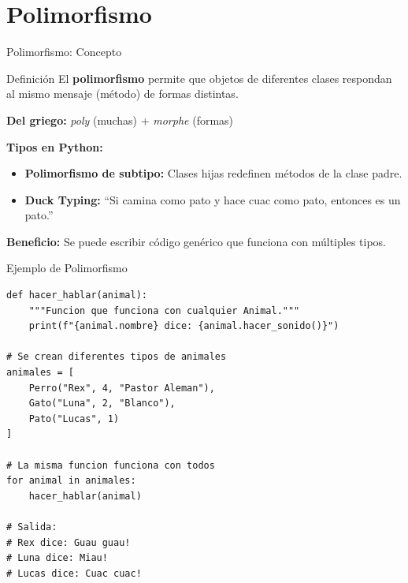 \documentclass[aspectratio=169]{beamer}
\begin{document}
\section{Polimorfismo}

\begin{frame}{Polimorfismo: Concepto}
    \begin{block}{Definición}
        El \textbf{polimorfismo} permite que objetos de diferentes clases respondan al mismo mensaje (método) de formas distintas.
    \end{block}
    \vspace{0.3cm}
    
    \textbf{Del griego:} \textit{poly} (muchas) + \textit{morphe} (formas)
    \vspace{0.5cm}
    
    \textbf{Tipos en Python:}
    \begin{itemize}
        \item \textbf{Polimorfismo de subtipo:} Clases hijas redefinen métodos de la clase padre.
        \item \textbf{Duck Typing:} ``Si camina como pato y hace cuac como pato, entonces es un pato.''
    \end{itemize}
    \vspace{0.3cm}
    
    \textbf{Beneficio:} Se puede escribir código genérico que funciona con múltiples tipos.
\end{frame}

\begin{frame}[fragile]{Ejemplo de Polimorfismo}
    \begin{lstlisting}[title=Polimorfismo con Herencia]
def hacer_hablar(animal):
    """Funcion que funciona con cualquier Animal."""
    print(f"{animal.nombre} dice: {animal.hacer_sonido()}")

# Se crean diferentes tipos de animales
animales = [
    Perro("Rex", 4, "Pastor Aleman"),
    Gato("Luna", 2, "Blanco"),
    Pato("Lucas", 1)
]

# La misma funcion funciona con todos
for animal in animales:
    hacer_hablar(animal)

# Salida:
# Rex dice: Guau guau!
# Luna dice: Miau!
# Lucas dice: Cuac cuac!
    \end{lstlisting}
\end{frame}
\end{document}
